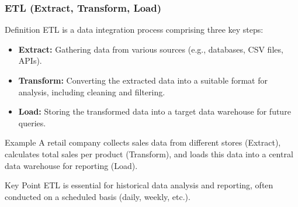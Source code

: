 \documentclass[aspectratio=169]{beamer}
\begin{document}
\begin{frame}[fragile]
    \frametitle{ETL (Extract, Transform, Load)}
    \begin{block}{Definition}
        ETL is a data integration process comprising three key steps:
        \begin{itemize}
            \item \textbf{Extract:} Gathering data from various sources (e.g., databases, CSV files, APIs).
            \item \textbf{Transform:} Converting the extracted data into a suitable format for analysis, including cleaning and filtering.
            \item \textbf{Load:} Storing the transformed data into a target data warehouse for future queries.
        \end{itemize}
    \end{block}
    
    \begin{block}{Example}
        A retail company collects sales data from different stores (Extract), calculates total sales per product (Transform), 
        and loads this data into a central data warehouse for reporting (Load).
    \end{block}
    
    \begin{block}{Key Point}
        ETL is essential for historical data analysis and reporting, often conducted on a scheduled basis (daily, weekly, etc.).
    \end{block}
\end{frame}
\end{document}
